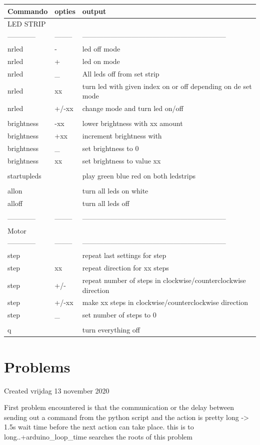 \documentclass{article}
\begin{document}
\begin{tabular}{ |l|l|l| }
\hline
 Commando & opties & output \tabularnewline
\hline
\hline
 LED STRIP &   &   \tabularnewline
\hline
 ------------ & -------- & -------------------------------------------------------------- \tabularnewline
\hline
 nrled & - & led off mode \tabularnewline
\hline
 nrled & + & led on mode \tabularnewline
\hline
 nrled & \_ & All leds off from set strip \tabularnewline
\hline
 nrled & xx & turn led with given index on or off depending on de set mode \tabularnewline
\hline
 nrled & +/-xx & change mode and turn led on/off \tabularnewline
\hline
   &   &   \tabularnewline
\hline
 brightness & -xx & lower brightness with xx amount \tabularnewline
\hline
 brightness & +xx & increment brightness with \tabularnewline
\hline
 brightness & \_ & set brightness to 0 \tabularnewline
\hline
 brightness & xx & set brightness to value xx \tabularnewline
\hline
   &   &   \tabularnewline
\hline
 startupleds &   & play green blue red on both ledstrips \tabularnewline
\hline
   &   &   \tabularnewline
\hline
 allon &   & turn all leds on white \tabularnewline
\hline
 alloff &   & turn all leds off \tabularnewline
\hline
   &   &   \tabularnewline
\hline
 ------------ & -------- & -------------------------------------------------------------- \tabularnewline
\hline
 Motor &   &   \tabularnewline
\hline
 ------------ & -------- & -------------------------------------------------------------- \tabularnewline
\hline
 step &   & repeat last settings for step \tabularnewline
\hline
 step & xx & repeat direction for xx steps \tabularnewline
\hline
 step & +/- & repeat number of steps in clockwise/counterclockwise direction \tabularnewline
\hline
 step & +/-xx & make xx steps in clockwise/counterclockwise direction \tabularnewline
\hline
 step & \_ & set number of steps to 0 \tabularnewline
\hline
   &   &   \tabularnewline
\hline
 q &   & turn everything off \tabularnewline
\hline
\end{tabular}

		
		
		\section{Problems}

Created vrijdag 13 november 2020



First problem encountered is that the communication or the delay between sending out a command from the python script and the action is pretty long -\textgreater{} 1.5s wait time before the next action can take place. this is to long..+arduino\_loop\_time searches the roots of this problem
\end{document}
